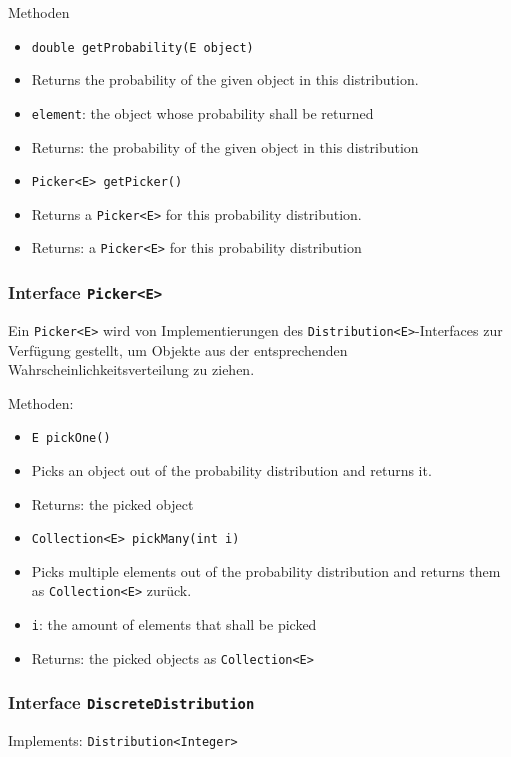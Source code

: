 \documentclass[parskip=full,11pt]{scrartcl}
\begin{document}
Methoden
\begin{itemize}\itemsep -10pt
\item \texttt{double getProbability(E object)}
\item[] Returns the probability of the given object in this distribution.
\item[] \texttt{element}: the object whose probability shall be returned
\item[] Returns: the probability of the given object in this distribution

\item \texttt{Picker<E> getPicker()}
\item[] Returns a \texttt{Picker<E>} for this probability distribution.
\item[] Returns: a \texttt{Picker<E>} for this probability distribution
\end{itemize}

\subsubsection{Interface \texttt{Picker<E>}}
Ein \texttt{Picker<E>} wird von Implementierungen des \texttt{Distribution<E>}-Interfaces zur Verfügung gestellt, um Objekte aus der entsprechenden Wahrscheinlichkeitsverteilung zu ziehen.

Methoden:
\begin{itemize}\itemsep -10pt
\item \texttt{E pickOne()}
\item[] Picks an object out of the probability distribution and returns it.
\item[] Returns: the picked object

\item \texttt{Collection<E> pickMany(int i)}
\item[] Picks multiple elements out of the probability distribution and returns them as \texttt{Collection<E>} zurück.
\item[] \texttt{i}: the amount of elements that shall be picked
\item[] Returns: the picked objects as \texttt{Collection<E>}
\end{itemize}

\subsubsection{Interface \texttt{DiscreteDistribution}}
Implements: \texttt{Distribution<Integer>}
\end{document}
